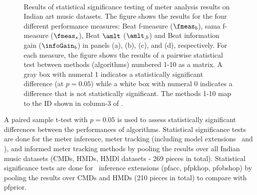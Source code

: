 \begin{figure}[t]
\centering
     \hspace{0.1cm}
    \\
     \hspace{0.1cm}
\caption[Results of statistical significance testing of meter analysis results on Indian art music datasets]{Results of statistical significance testing of meter analysis results on Indian art music datasets. The figure shows the results for the four different performance measures: Beat f-measure ($\fmeas_b$), \Gls{sama} f-measure ($\fmeas_s$), Beat $\amlt$ ($\amlt_{,b}$) and Beat information gain ($\infoGain_b$) in panels (a), (b), (c), and (d), respectively. For each measure, the figure shows the results of a pairwise statistical test between methods (algorithms) numbered 1-10 as a matrix. A gray box with numeral 1 indicates a statistically significant difference (at $p=0.05$) while a white box with numeral 0 indicates a difference that is not statistically significant. The methods 1-10 map to the ID shown in column-3 of .}\label{fig:statTest:all} %
\end{figure}  


A paired sample t-test with $p=0.05$ is used to assess statistically significant differences between the performances of algorithms. Statistical significance tests are done for the meter inference, meter tracking (including model extensions \momodel\ and \spmodel), and informed meter tracking methods by pooling the results over all Indian music datasets (\acrshort{CMDs}, \acrshort{HMDs}, \acrshort{HMDl} datasets - 269 pieces in total). Statistical significance tests are done for \bpmodel\ inference extensions (\acrshort{pfacc}, \acrshort{pfpkhop}, \acrshort{pfobshop}) by pooling the results over \acrshort{CMDs} and \acrshort{HMDs} (210 pieces in total) to compare with \acrshort{pfprior}.

